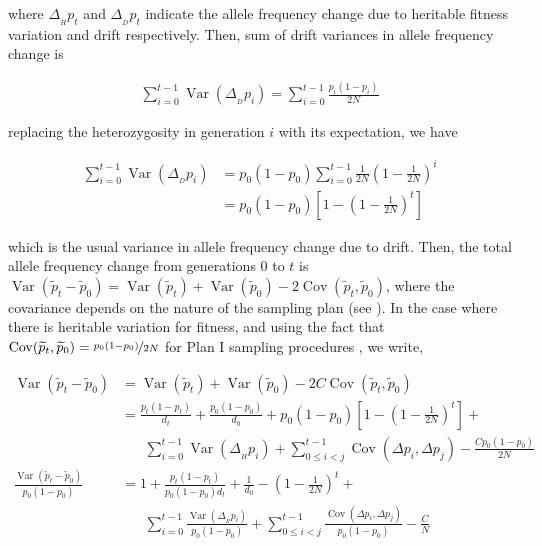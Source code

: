 \documentclass[11pt]{article}
\DeclareMathOperator{\var}{Var}
\DeclareMathOperator{\cov}{Cov}
\begin{document}
where $\Delta_{_H} p_t$ and $\Delta_{_D} p_t$ indicate the allele frequency
change due to heritable fitness variation and drift respectively. Then, sum of
drift variances in allele frequency change is

\begin{align}
  \sum_{i=0}^{t-1} \var(\Delta_{_D} p_i) = \sum_{i=0}^{t-1} \frac{p_i(1-p_i)}{2N}
\end{align}

replacing the heterozygosity in generation $i$ with its expectation, we have

\begin{align}
  \sum_{i=0}^{t-1} \var(\Delta_{_D} p_i) &= p_0(1-p_0) \sum_{i=0}^{t-1} \frac{1}{2N} \left(1-\frac{1}{2N}\right)^i \\
                                         &= p_0(1-p_0) \left[1 - \left(1-\frac{1}{2N}\right)^t \right]
\end{align}

which is the usual variance in allele frequency change due to drift.  Then, the
total allele frequency change from generations $0$ to $t$ is
$\var(\widetilde{p}_t - \widetilde{p}_0) = \var(\widetilde{p}_t) +
\var(\widetilde{p}_0) - 2 \cov(\widetilde{p}_t, \widetilde{p}_0)$, where the
covariance depends on the nature of the sampling plan (see \cite{Nei1981-oy,
Waples1989-sj}). In the case where there is heritable variation for fitness,
and using the fact that $\cov(\widetilde{p}_t, \widetilde{p}_0) =
\nicefrac{p_0(1-p_0)}{2N}$ for Plan I sampling procedures
\parencite{Waples1989-sj}, we write,

\begin{align}
  \var(\widetilde{p}_t - \widetilde{p}_0) &= \var(\widetilde{p}_t) + \var(\widetilde{p}_0) - 2 C \cov(\widetilde{p}_t, \widetilde{p}_0) \\
                                          &= \frac{p_t(1-p_t)}{d_t}  + \frac{p_0(1-p_0)}{d_0} + p_0(1-p_0) \left[1 - \left(1-\frac{1}{2N}\right)^t \right] + \\ & \;\;\;\;\;\;
                                               \sum_{i=0}^{t-1} \var(\Delta_{_H} p_i)  + \sum_{0 \le i < j}^{t-1} \cov(\Delta p_i, \Delta p_j) - \frac{C p_0(1-p_0)}{2N} \\
  \frac{\var(\widetilde{p}_t - \widetilde{p}_0)}{p_0(1-p_0)} &= 1 + \frac{p_t(1-p_t)}{p_0(1-p_0)d_t}  + \frac{1}{d_0} - \left(1-\frac{1}{2N}\right)^t + \\ & \;\;\;\;\;\;
  \sum_{i=0}^{t-1} \frac{\var(\Delta_{_H} p_i)}{p_0(1-p_0)}  + \sum_{0 \le i < j}^{t-1} \frac{\cov(\Delta p_i, \Delta p_j)}{p_0(1-p_0)} - \frac{C}{N}
\end{align}
\end{document}
